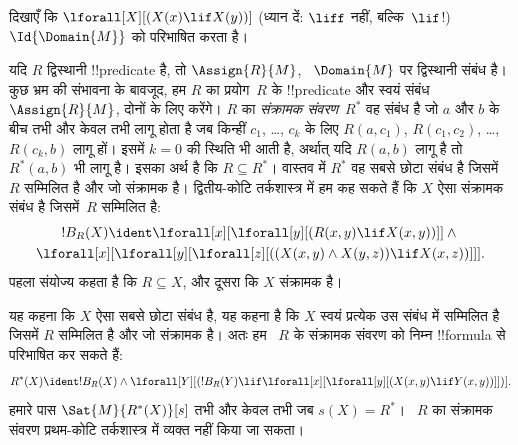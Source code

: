 \documentclass[../../../include/open-logic-section]{subfiles}
\begin{document}
\begin{prob}
दिखाएँ कि $\lforall[X][(X(x) \lif X(y))]$ (ध्यान दें: $\liff$ नहीं,
बल्कि~$\lif$!) $\Id{\Domain{M}}$ को परिभाषित करता है।
\end{prob}

\begin{ex}
यदि $R$ द्विस्थानी !!{predicate} है, तो $\Assign{R}{M}$,
~$\Domain{M}$ पर द्विस्थानी संबंध है। कुछ भ्रम की संभावना के बावजूद, हम
$R$ का प्रयोग~$R$ के !!{predicate} और स्वयं संबंध~$\Assign{R}{M}$, दोनों के
लिए करेंगे। $R$ का \emph{संक्रामक संवरण}~$R^*$ वह संबंध है जो $a$ और $b$
के बीच तभी और केवल तभी लागू होता है जब किन्हीं $c_1$, \dots, $c_k$ के लिए
$R(a,c_1)$, $R(c_1, c_2)$, \dots, $R(c_k,b)$ लागू हों। इसमें $k = 0$ की
स्थिति भी आती है, अर्थात् यदि $R(a,b)$ लागू है तो $R^*(a,b)$ भी लागू है।
इसका अर्थ है कि $R \subseteq R^*$। वास्तव में $R^*$ वह सबसे छोटा संबंध है
जिसमें~$R$ सम्मिलित है और जो संक्रामक है। द्वितीय-कोटि तर्कशास्त्र में हम
कह सकते हैं कि $X$ ऐसा संक्रामक संबंध है जिसमें~$R$ सम्मिलित है:
\begin{multline*}
  {}!B_R(X) \ident \lforall[x][\lforall[y][(R(x,y) \lif X(x, y))]] \land {}\\
\lforall[x][\lforall[y][\lforall[z][((X(x,y) \land X(y,z)) \lif X(x,
      z))]]].
\end{multline*}
पहला संयोज्य कहता है कि $R \subseteq X$, और दूसरा कि $X$ संक्रामक है।

यह कहना कि $X$ ऐसा सबसे छोटा संबंध है, यह कहना है कि $X$ स्वयं प्रत्येक उस
संबंध में सम्मिलित है जिसमें $R$ सम्मिलित है और जो संक्रामक है। अतः हम
~$R$ के संक्रामक संवरण को निम्न !!{formula} से परिभाषित कर सकते हैं:
\[
R^*(X) \ident !B_R(X) \land \lforall[Y][(!B_R(Y) \lif
  \lforall[x][\lforall[y][(X(x, y) \lif Y(x,y))]])].
\]
हमारे पास $\Sat{M}{R^*(X)}[s]$ तभी और केवल तभी जब $s(X) = R^*$।
~$R$ का संक्रामक संवरण प्रथम-कोटि तर्कशास्त्र में व्यक्त नहीं किया जा सकता।
\end{ex}
\end{document}
